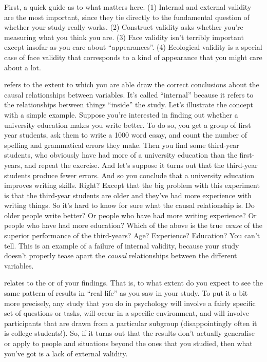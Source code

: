 First, a quick guide as to what matters here. (1) Internal and external validity are the most important, since they tie directly to the fundamental question of whether your study really works. (2) Construct validity asks whether you're measuring what you think you are. (3) Face validity isn't terribly important except insofar as you care about ``appearances''. (4) Ecological validity is a special case of face validity that corresponds to a kind of appearance that you might care about a lot.


 refers to the extent to which you are able draw the correct conclusions about the causal relationships between variables. It's called ``internal'' because it refers to the relationships between things ``inside'' the study.  Let's illustrate the concept with a simple example. Suppose you're interested in finding out whether a university education makes you write better. To do so, you get a group of first year students, ask them to write a 1000 word essay, and count the number of spelling and grammatical errors they make. Then you find some third-year students, who obviously have had more of a university education than the first-years, and repeat the exercise. And let's suppose it turns out that the third-year students produce fewer errors. And so you conclude that a university education improves writing skills. Right? Except that the big problem with this experiment is that the third-year students are older and they've had more experience with writing things. So it's hard to know for sure what the causal relationship is. Do older people write better? Or people who have had more writing experience? Or people who have had more education? Which of the above is the true {\it cause} of the superior performance of the third-years? Age? Experience? Education?  You can't tell.  This is an example of a failure of internal validity, because your study doesn't properly tease apart the {\it causal} relationships between the different variables. 


 relates to the  or  of your findings. That is, to what extent do you expect to see the same pattern of results in ``real life'' as you saw in your study. To put it a bit more precisely, any study that you do in psychology will involve a fairly specific set of questions or tasks, will occur in a specific environment, and will involve participants that are drawn from a particular subgroup (disappointingly often it is college students!). So, if it turns out that the results don't actually generalise or apply to people and situations beyond the ones that you studied, then what you've got is a lack of external validity.

